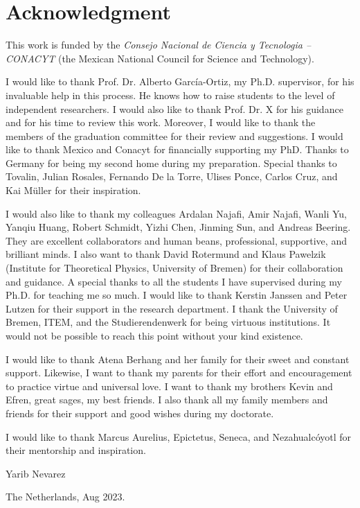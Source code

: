 \chapter*{Acknowledgment}
\thispagestyle{empty}
This work is funded by the \textit{Consejo Nacional de Ciencia y Tecnologia -- CONACYT} (the Mexican National Council for Science and Technology).

I would like to thank Prof. Dr. Alberto Garc\'ia-Ortiz, my Ph.D. supervisor, for his invaluable help in this process. He knows how to raise students to the level of independent researchers. I would also like to thank Prof. Dr. X for his guidance and for his time to review this work. Moreover, I would like to thank the members of the graduation committee for their review and suggestions. I would like to thank Mexico and Conacyt for financially supporting my PhD. Thanks to Germany for being my second home during my preparation. Special thanks to Tovalin, Julian Rosales, Fernando De la Torre, Ulises Ponce, Carlos Cruz, and Kai M\"uller for their inspiration.

I would also like to thank my colleagues Ardalan Najafi, Amir Najafi, Wanli Yu, Yanqiu Huang, Robert Schmidt, Yizhi Chen, Jinming Sun, and Andreas Beering. They are excellent collaborators and human beans, professional, supportive, and brilliant minds. I also want to thank David Rotermund and Klaus Pawelzik (Institute for Theoretical Physics, University of Bremen) for their collaboration and guidance. A special thanks to all the students I have supervised during my Ph.D. for teaching me so much. I would like to thank Kerstin Janssen and Peter Lutzen for their support in the research department. I thank the University of Bremen, ITEM, and the Studierendenwerk for being virtuous institutions. It would not be possible to reach this point without your kind existence.


I would like to thank Atena Berhang and her family for their sweet and constant support. Likewise, I want to thank my parents for their effort and encouragement to practice virtue and universal love. I want to thank my brothers Kevin and Efren, great sages, my best friends. I also thank all my family members and friends for their support and good wishes during my doctorate.

I would like to thank Marcus Aurelius, Epictetus, Seneca, and Nezahualc\'oyotl for their mentorship and inspiration.


Yarib Nevarez

The Netherlands, Aug 2023.





